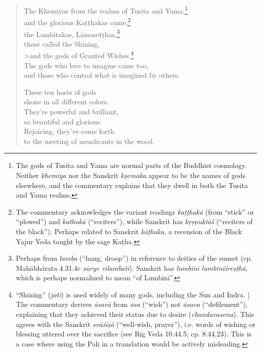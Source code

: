 \documentclass[12pt,openany]{book}%
\begin{document}
\begin{verse}
The Khemiyas from the realms of Tusita and Yama,\footnote{The gods of Tusita and Yama are normal parts of the Buddhist cosmology. Neither \textit{khemiya} nor the Sanskrit \textit{\textsanskrit{kṣemaka}} appear to be the names of gods elsewhere, and the commentary explains that they dwell in both the Tusita and Yama realms. } \\
and the glorious \textsanskrit{Kaṭṭhakas} came;\footnote{The commentary acknowledges the variant readings \textit{\textsanskrit{kaṭṭhakā}} (from “stick” or “plowed”) and \textit{\textsanskrit{kathakā}} (“reciters”), while Sanskrit has \textit{\textsanskrit{kṛṣṇuktāś}} (“reciters of the black”). Perhaps related to Sanskrit \textit{\textsanskrit{kāṭhaka}}, a recension of the Black Yajur Veda taught by the sage \textsanskrit{Kaṭha}. } \\
the \textsanskrit{Lambītakas}, \textsanskrit{Lāmaseṭṭhas},\footnote{Perhaps from \textit{lamba} (“hang, droop”) in reference to deities of the sunset (cp. \textsanskrit{Mahābhārata} 4.31.4c \textit{\textsanskrit{sūrye} vilambati}). Sanskrit has \textit{\textsanskrit{lumbinī} \textsanskrit{lumbinīśreṣṭhā}}, which is perhaps normalized to mean “of \textsanskrit{Lumbinī}”. } \\
those called the Shining, \\>and the gods of Granted Wishes.\footnote{“Shining” (\textit{joti}) is used widely of many gods, including the Sun and Indra. | The commentary derives \textit{\textsanskrit{āsavā}} from \textit{\textsanskrit{āsa}} (“wish”) not \textit{\textsanskrit{āsava}} (“defilement”), explaining that they achieved their status due to desire (\textit{chandavasena}). This agrees with the Sanskrit \textit{\textsanskrit{svāśiṣā}} (“well-wish, prayer”), i.e. words of wishing or blessing uttered over the sacrifice (see Rig Veda 10.44.5; cp. 8.44.23). This is a case where using the Pali in a translation would be actively misleading. } \\
The gods who love to imagine came too, \\
and those who control what is imagined by others. 

These ten hosts of gods \\
shone in all different colors. \\
They’re powerful and brilliant, \\
so beautiful and glorious. \\
Rejoicing, they’ve come forth \\
to the meeting of mendicants in the wood. 


\end{verse}
\end{document}
